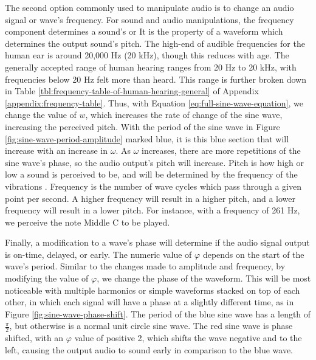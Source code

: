 The second option commonly used to manipulate audio is to change an audio signal or wave's frequency. For sound and audio manipulations, the frequency component determines a sound's  or  It is the property of a waveform which determines the output sound's pitch. The high-end of audible frequencies for the human ear is around 20,000 Hz (20 kHz), though this reduces with age. The generally accepted range of human hearing ranges from 20 Hz to 20 kHz, with frequencies below 20 Hz felt more than heard\cite{Rosen_Howell_2011}. This range is further broken down in Table \ref{tbl:frequency-table-of-human-hearing-general} of Appendix \ref{appendix:frequency-table}. Thus, with Equation \ref{eq:full-sine-wave-equation}, we change the value of $w$, which increases the rate of change of the sine wave, increasing the perceived pitch. With the period of the sine wave in Figure \ref{fig:sine-wave-period-amplitude} marked blue, it is this blue section that will increase with an increase in $\omega$. As $\omega$ increases, there are more repetitions of the sine wave's phase, so the audio output's pitch will increase. Pitch is how high or low a sound is perceived to be, and will be determined by the frequency of the vibrations \cite{Toft_2020}. Frequency is the number of wave cycles which pass through a given point per second. A higher frequency will result in a higher pitch, and a lower frequency will result in a lower pitch. For instance, with a frequency of 261 Hz, we perceive the note Middle C to be played. 

Finally, a modification to a wave's phase will determine if the audio signal output is on-time, delayed, or early. The numeric value of $\varphi$ depends on the start of the wave's period. Similar to the changes made to amplitude and frequency, by modifying the value of $\varphi$, we change the phase of the waveform. This will be most noticeable with multiple harmonics or simple waveforms stacked on top of each other, in which each signal will have a phase at a slightly different time, as in Figure \ref{fig:sine-wave-phase-shift}. The period of the blue sine wave has a length of $\frac{\pi}{2}$, but otherwise is a normal unit circle sine wave. The red sine wave is phase shifted, with an $\varphi$ value of positive 2, which shifts the wave negative and to the left, causing the output audio to sound early in comparison to the blue wave. 

